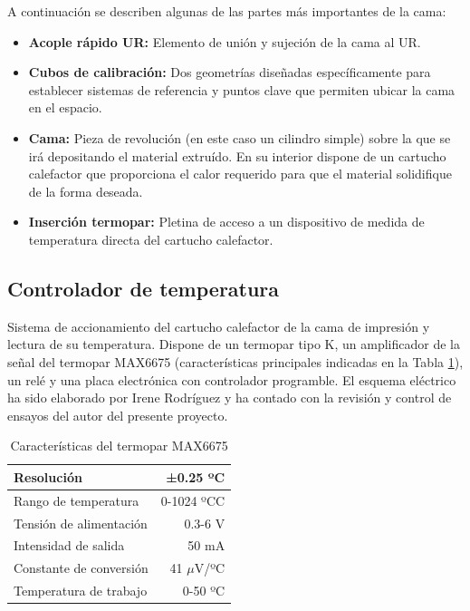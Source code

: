 A continuación se describen algunas de las partes más importantes de la cama:

\begin{itemize}
    \item \textbf{Acople rápido UR:} Elemento de unión y sujeción de la cama al UR.
    \item \textbf{Cubos de calibración:} Dos geometrías diseñadas específicamente para establecer sistemas de referencia y puntos clave que permiten ubicar la cama en el espacio.
    \item \textbf{Cama:} Pieza de revolución (en este caso un cilindro simple) sobre la que se irá depositando el material extruído. En su interior dispone de un cartucho calefactor que proporciona el calor requerido para que el material solidifique de la forma deseada.
    \item \textbf{Inserción termopar:} Pletina de acceso a un dispositivo de medida de temperatura directa del cartucho calefactor.
\end{itemize}

\subsection{Controlador de temperatura}
Sistema de accionamiento del cartucho calefactor de la cama de impresión y lectura de su temperatura. Dispone de un termopar tipo K, un amplificador de la señal del termopar MAX6675 (características principales indicadas en la Tabla \ref{tab:caracteristicas_termopar}), un relé y una placa electrónica con controlador programble. El esquema eléctrico ha sido elaborado por Irene Rodríguez y ha contado con la revisión y control de ensayos del autor del presente proyecto.

\begin{table}[H]
    \centering
       \begin{tabular}{|l|r|}
            \hline
            Resolución & ±0.25 ºC\\
            \hline
            Rango de temperatura & 0-1024 ºCC \\
            \hline
            Tensión de alimentación & 0.3-6 V\\
            \hline
            Intensidad de salida & 50 mA \\
            \hline
            Constante de conversión & 41 $\mu$V/ºC \\
            \hline
            Temperatura de trabajo & 0-50 ºC \\
            \hline
        \end{tabular}
    \caption{Características del termopar MAX6675 \cite{manual_termopar_driver_max6675}}
    \label{tab:caracteristicas_termopar}
\end{table}

